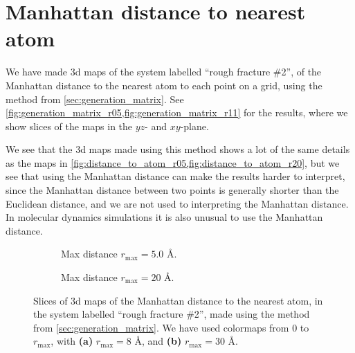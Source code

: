 \section{Manhattan distance to nearest atom\label{sec:results_last_sec}}
%
We have made 3d maps of the system labelled ``rough fracture \#2'', of the Manhattan distance to the nearest atom to each point on a grid, using the method from \cref{sec:generation_matrix}. See \cref{fig:generation_matrix_r05,fig:generation_matrix_r11} for the results, where we show slices of the maps in the $yz$- and $xy$-plane.

We see that the 3d maps made using this method shows a lot of the same details as the maps in \cref{fig:distance_to_atom_r05,fig:distance_to_atom_r20}, but we see that using the Manhattan distance can make the results harder to interpret, since the Manhattan distance between two points is generally shorter than the Euclidean distance, and we are not used to interpreting the Manhattan distance. In molecular dynamics simulations it is also unusual to use the Manhattan distance.%
%
\begin{figure}[!p]%
    \centering%
    \setlength{\myfigwidth}{\textwidth}%
    \begin{subfigure}[b]{\myfigwidth}%
        \caption{Max distance $r_\text{max}=5.0$ \AA.%
        \label{fig:generation_matrix_r05}}%
    \end{subfigure}%
    \vspace{10pt}
    \begin{subfigure}[b]{\myfigwidth}%
        \caption{Max distance $r_\text{max}=20$ \AA.%
        \label{fig:generation_matrix_r11}}%
    \end{subfigure}%
    \captionsetup{width=\textwidth}%
    \caption{%
        Slices of 3d maps of the Manhattan distance to the nearest atom, in the system labelled ``rough fracture \#2'', made using the method from \cref{sec:generation_matrix}. We have used colormaps from 0 to $r_\text{max}$, with \textbf{(a)} $r_\text{max} = 8$ \AA, and \textbf{(b)} $r_\text{max} = 30$ \AA.%
    }%
\end{figure}%